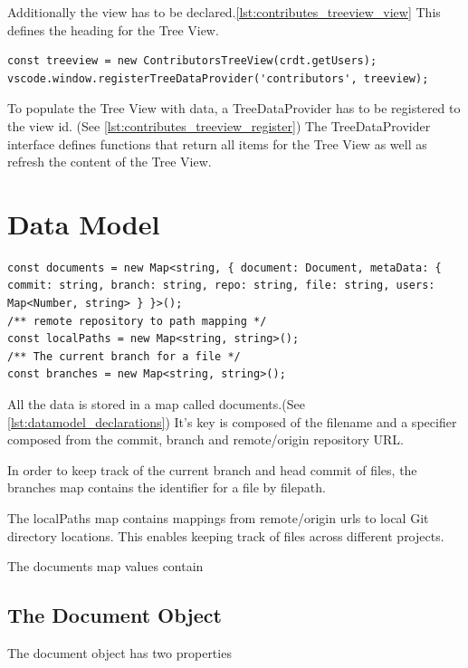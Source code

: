 Additionally the view has to be declared.\ref{lst:contributes_treeview_view} This defines the heading for the Tree View.

\begin{lstlisting}[label={lst:contributes_treeview_register}, caption=Define Tree View Data Provider]
const treeview = new ContributorsTreeView(crdt.getUsers);
vscode.window.registerTreeDataProvider('contributors', treeview);
\end{lstlisting}

To populate the Tree View with data, a TreeDataProvider has to be registered to the view id. (See \ref{lst:contributes_treeview_register})
The TreeDataProvider interface defines functions that return all items for the Tree View as well as refresh the content of the Tree View.

\section{Data Model}

\begin{lstlisting}[label={lst:datamodel_declarations}, caption=Data Model Declarations]
const documents = new Map<string, { document: Document, metaData: { commit: string, branch: string, repo: string, file: string, users: Map<Number, string> } }>();
/** remote repository to path mapping */
const localPaths = new Map<string, string>();
/** The current branch for a file */
const branches = new Map<string, string>();
\end{lstlisting}

All the data is stored in a map called documents.(See \ref{lst:datamodel_declarations})
It's key is composed of the filename and a specifier composed from the commit, branch and remote/origin repository URL.

In order to keep track of the current branch and head commit of files, the branches map contains the identifier for a file by filepath.

The localPaths map contains mappings from remote/origin urls to local Git directory locations.
This enables keeping track of files across different projects.


The documents map values contain

\subsection{The Document Object}

The document object has two properties

